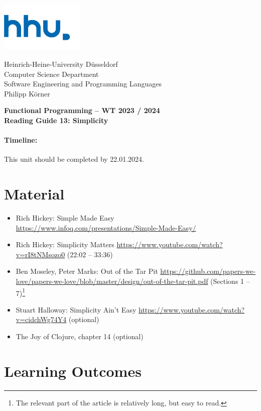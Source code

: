 \documentclass[11pt,a4paper]{article}
\begin{document}
\begin{minipage}[b]{\textwidth}
	\parbox[t]{5cm}{%
		\includegraphics[width=4cm]{unilogo}
		\hfill
	}
	\parbox[b]{11cm}{%
		Heinrich-Heine-University D\"usseldorf\\
		Computer Science Department\\
		Software Engineering and Programming Languages\\
		Philipp K\"orner
	}
\end{minipage}
\begin{center}
	\bf
	Functional Programming -- WT 2023 / 2024\\
	Reading Guide 13: Simplicity
\end{center}

\pagestyle{empty}

\paragraph{Timeline:} This unit should be completed by 22.01.2024.

\section{Material} 

\begin{itemize}
\item Rich Hickey: Simple Made Easy \url{https://www.infoq.com/presentations/Simple-Made-Easy/}
\item Rich Hickey: Simplicity Matters \url{https://www.youtube.com/watch?v=rI8tNMsozo0} (22:02 -- 33:36)
\item Ben Moseley, Peter Marks: Out of the Tar Pit \url{https://github.com/papers-we-love/papers-we-love/blob/master/design/out-of-the-tar-pit.pdf} (Sections 1 -- 7)\footnote{The relevant part of the article is relatively long, but easy to read.}
\item Stuart Halloway: Simplicity Ain't Easy \url{https://www.youtube.com/watch?v=cidchWg74Y4} (optional)
\item The Joy of Clojure, chapter 14 (optional)
\end{itemize}


\section{Learning Outcomes}
\end{document}
